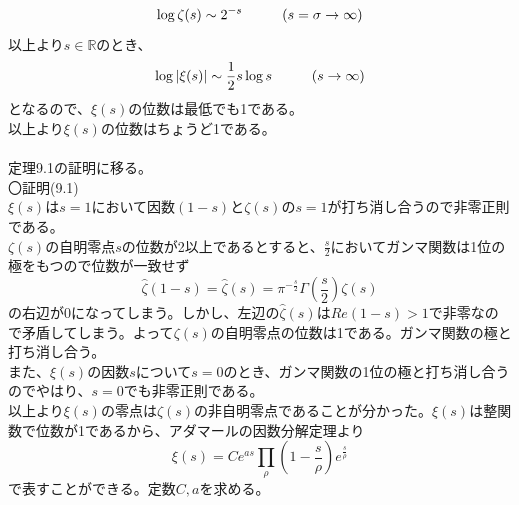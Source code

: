\documentclass{jsarticle}
\begin{document}
\[\log\zeta(s)\sim2^{-s}\hspace{10mm}(s=\sigma\to\infty)\]
以上より\(s\in\mathbb{R}\)のとき、
\[\log|\xi(s)|\sim\frac{1}{2}s\log s\hspace{10mm}(s\to\infty)\]
となるので、\(\xi(s)\)の位数は最低でも1である。\\
以上より\(\xi(s)\)の位数はちょうど1である。\\
\\
定理9.1の証明に移る。\\
〇証明(9.1)\\
\(\xi(s)\)は\(s=1\)において因数\((1-s)\)と\(\zeta(s)\)の\(s=1\)が打ち消し合うので非零正則である。\\
\(\zeta(s)\)の自明零点\(s\)の位数が2以上であるとすると、\(\frac{s}{2}\)においてガンマ関数は1位の極をもつので位数が一致せず
\[\hat{\zeta}(1-s)=\hat{\zeta}(s)=\pi^{-\frac{s}{2}}\Gamma\left(\frac{s}{2}\right)\zeta(s)\]
の右辺が0になってしまう。しかし、左辺の\(\hat{\zeta}(s)\)は\(Re(1-s)>1\)で非零なので矛盾してしまう。よって\(\zeta(s)\)の自明零点の位数は1である。ガンマ関数の極と打ち消し合う。\\
また、\(\xi(s)\)の因数\(s\)について\(s=0\)のとき、ガンマ関数の1位の極と打ち消し合うのでやはり、\(s=0\)でも非零正則である。\\
以上より\(\xi(s)\)の零点は\(\zeta(s)\)の非自明零点であることが分かった。\(\xi(s)\)は整関数で位数が1であるから、アダマールの因数分解定理より
\[\xi(s)=Ce^{as}\prod_{\rho}\left(1-\frac{s}{\rho}\right)e^{\frac{s}{\rho}}\]
で表すことができる。定数\(C,a\)を求める。









\setcounter{equation}{0}
\end{document}

